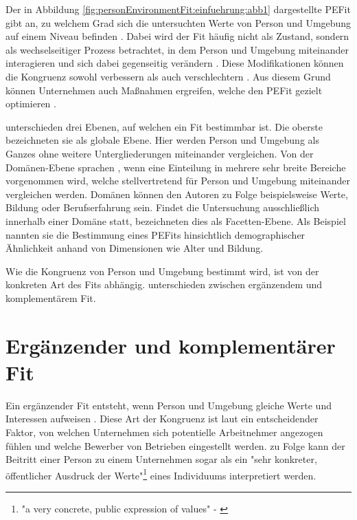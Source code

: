 Der in Abbildung \ref{fig:personEnvironmentFit:einfuehrung:abb1} dargestellte \ac{PEFit} gibt an, zu welchem Grad sich die untersuchten Werte von Person und Umgebung auf einem Niveau befinden \cite[S. 53]{edwards:2008}. Dabei wird der Fit häufig nicht als Zustand, sondern als wechselseitiger Prozess betrachtet, in dem Person und Umgebung miteinander interagieren und sich dabei gegenseitig verändern \cite[S. 10ff.]{su:2015}. Diese Modifikationen können die Kongruenz sowohl verbessern als auch verschlechtern \cite[S. 4]{caplan:1987}. Aus diesem Grund können Unternehmen auch Maßnahmen ergreifen, welche den \ac{PEFit} gezielt optimieren \cite[S. 16]{cable:2001}.

\textcite[S. 6ff.]{edwards:2007} unterschieden drei Ebenen, auf welchen ein Fit bestimmbar ist. Die oberste bezeichneten sie als globale Ebene. Hier werden Person und Umgebung als Ganzes ohne weitere Untergliederungen miteinander vergleichen. Von der Domänen-Ebene sprachen \textcite[S. 7f.]{edwards:2007}, wenn eine Einteilung in mehrere sehr breite Bereiche vorgenommen wird, welche stellvertretend für Person und Umgebung miteinander vergleichen werden. Domänen können den Autoren zu Folge beispielsweise Werte, Bildung oder Berufserfahrung sein. Findet die Untersuchung ausschließlich innerhalb einer Domäne statt, bezeichneten \textcite[S. 7f.]{edwards:2007} dies als Facetten-Ebene. Als Beispiel nannten sie die Bestimmung eines \acp{PEFit} hinsichtlich demographischer Ähnlichkeit anhand von Dimensionen wie Alter und Bildung.

Wie die Kongruenz von Person und Umgebung bestimmt wird, ist von der konkreten Art des Fits abhängig. \textcite[S. 1]{muchinsky:1987} unterschieden zwischen ergänzendem und komplementärem Fit.

\section{Ergänzender und komplementärer Fit}
\label{ch:personEnvironmentFit:supplementaryUndComplementary}
Ein ergänzender Fit entsteht, wenn Person und Umgebung gleiche Werte und Interessen aufweisen \cite[S. 2ff.]{muchinsky:1987}. Diese Art der Kongruenz ist laut \textcite[S. 5ff.]{schneider:1987} ein entscheidender Faktor, von welchen Unternehmen sich potentielle Arbeitnehmer angezogen fühlen und welche Bewerber von Betrieben eingestellt werden. \textcite[S. 4, Z. 47f.]{popovich:1982} zu Folge kann der Beitritt einer Person zu einem Unternehmen sogar als ein "sehr konkreter, öffentlicher Ausdruck der Werte"\footnote{"a very concrete, public expression of values" - \textcite[S. 4, Z. 47f.]{popovich:1982}} eines Individuums interpretiert werden.

